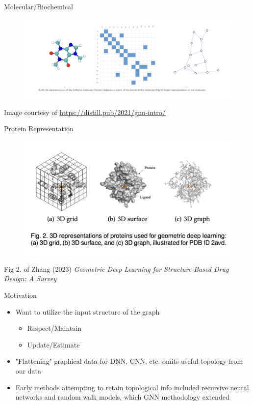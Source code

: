\documentclass{beamer}
\begin{document}
\begin{frame}{Molecular/Biochemical }
    \begin{figure}
        \centering
        \includegraphics[scale=0.3]{Caffeine_Graph.png}
    \end{figure}
    Image courtesy of \url{https://distill.pub/2021/gnn-intro/} \cite{sanchez-lengeling_gentle_2021}
\end{frame}

\begin{frame}{Protein Representation }
    \begin{figure}
        \centering
        \includegraphics[scale=0.45]{Zhang_Protein3D.png}
    \end{figure}
    Fig 2. of Zhang (2023) {\it Geometric Deep Learning for Structure-Based Drug Design: A Survey} \cite{zhang_systematic_2023}
\end{frame}

\begin{frame}{Motivation}
    \begin{itemize}
        \item Want to utilize the input structure of the graph
        \begin{itemize}
            \item Respect/Maintain
            \item Update/Estimate
        \end{itemize} 
        \item "Flattening" graphical data for DNN, CNN, etc. omits useful topology from our data 
        \item Early methods attempting to retain topological info included recursive neural networks and random walk models, which GNN methodology extended \cite{scarselli_graph_2009} 
    \end{itemize}
\end{frame}
\end{document}
